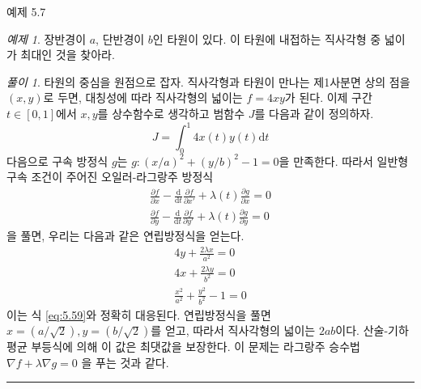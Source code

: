 \documentclass[chapter, oneside, b5paper]{oblivoir}
\theoremstyle{plain}
\theoremstyle{definition}
\theoremstyle{remark}
\newtheorem{example}{예제}[chapter]    %
\newtheorem*{solution}{풀이}
\begin{document}
\begin{examplebox}{예제 5.7}
\begin{example}
장반경이 $a$, 단반경이 $b$인 타원이 있다. 이 타원에 내접하는 직사각형 중 넓이가 최대인 것을 찾아라.
\end{example}
\end{examplebox}

\begin{solution}
    타원의 중심을 원점으로 잡자. 직사각형과 타원이 만나는 제1사분면 상의 점을 $(x, y)$로 두면, 대칭성에 따라 직사각형의 넓이는 $f=4xy$가 된다. 이제 구간 $t \in [0, 1]$에서 $x, y$를 상수함수로 생각하고 범함수 $J$를 다음과 같이 정의하자.
    \begin{equation}
        J = \int_0^1 4x(t)y(t)\mathrm{d}t 
    \end{equation}
    다음으로 구속 방정식 $g$는 $g:(x/a)^2 + (y/b)^2 - 1 = 0$을 만족한다. 따라서 일반형 구속 조건이 주어진 오일러-라그랑주 방정식
    \begin{equation}
        \begin{aligned}
            \frac{\partial f}{\partial x} - \frac{\mathrm{d}}{\mathrm{d}t}\frac{\partial f}{\partial x'} + \lambda(t)\frac{\partial g}{\partial x} = 0 \\
            \frac{\partial f}{\partial y} - \frac{\mathrm{d}}{\mathrm{d}t}\frac{\partial f}{\partial y'} + \lambda(t)\frac{\partial g}{\partial y} = 0
        \end{aligned}
    \end{equation}
    을 풀면, 우리는 다음과 같은 연립방정식을 얻는다.
    \begin{equation}
        \begin{aligned}
            4y + \frac{2\lambda x}{a^2} = 0 \\
            4x + \frac{2\lambda y}{b^2} = 0 \\
            \frac{x^2}{a^2} + \frac{y^2}{b^2} - 1 = 0
        \end{aligned}
    \end{equation}
    이는 식 \ref{eq:5.59}와 정확히 대응된다. 연립방정식을 풀면 $x = (a/\sqrt{2}), y = (b/\sqrt{2})$를 얻고, 따라서 직사각형의 넓이는 $2ab$이다. 산술-기하평균 부등식에 의해 이 값은 최댓값을 보장한다. 이 문제는 라그랑주 승수법 $\nabla f + \lambda \nabla g = 0$ 을 푸는 것과 같다.
\end{solution}

\noindent\rule{\textwidth}{0.8pt} %
\vspace{1em} %
\end{document}
